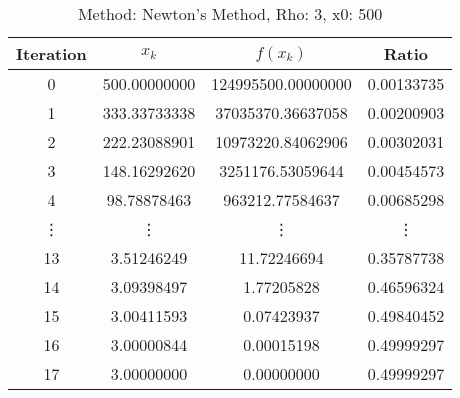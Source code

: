 \begin{table}
\centering
\caption{Method: Newton's Method, Rho: 3, x0: 500}
\label{tab:table_Newton's_Method_3_500}
\begin{tabular}{c c c c}
\toprule
Iteration &        $x_k$ &           $f(x_k)$ &      Ratio \\
\midrule
        0 & 500.00000000 & 124995500.00000000 & 0.00133735 \\
        1 & 333.33733338 &  37035370.36637058 & 0.00200903 \\
        2 & 222.23088901 &  10973220.84062906 & 0.00302031 \\
        3 & 148.16292620 &   3251176.53059644 & 0.00454573 \\
        4 &  98.78878463 &    963212.77584637 & 0.00685298 \\
   \vdots &       \vdots &             \vdots &     \vdots \\
       13 &   3.51246249 &        11.72246694 & 0.35787738 \\
       14 &   3.09398497 &         1.77205828 & 0.46596324 \\
       15 &   3.00411593 &         0.07423937 & 0.49840452 \\
       16 &   3.00000844 &         0.00015198 & 0.49999297 \\
       17 &   3.00000000 &         0.00000000 & 0.49999297 \\
\bottomrule
\end{tabular}
\end{table}
